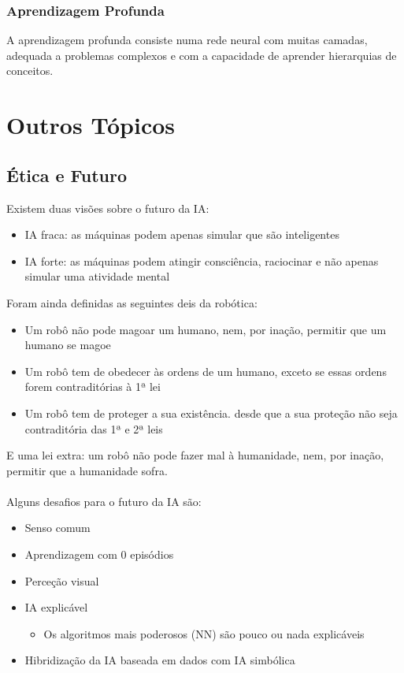 \documentclass[10pt,a4paper]{report}
\begin{document}
\subsection{Aprendizagem Profunda}
A aprendizagem profunda consiste numa rede neural com muitas camadas, adequada a problemas complexos e com a capacidade de aprender hierarquias de conceitos.

\chapter{Outros Tópicos}
\section{Ética e Futuro}
Existem duas visões sobre o futuro da IA:
\begin{itemize}
\item IA fraca: as máquinas podem apenas simular que são inteligentes
\item IA forte: as máquinas podem atingir consciência, raciocinar e não apenas simular uma atividade mental
\end{itemize}
Foram ainda definidas as seguintes deis da robótica:
\begin{itemize}
\item Um robô não pode magoar um humano, nem, por inação, permitir que um humano se magoe
\item Um robô tem de obedecer às ordens de um humano, exceto se essas ordens forem contraditórias à 1ª lei
\item Um robô tem de proteger a sua existência. desde que a sua proteção não seja contraditória das 1ª e 2ª leis
\end{itemize}
E uma lei extra: um robô não pode fazer mal à humanidade, nem, por inação, permitir que a humanidade sofra.\\
\\
Alguns desafios para o futuro da IA são:
\begin{itemize}
\item Senso comum
\item Aprendizagem com 0 episódios
\item Perceção visual
\item IA explicável
\begin{itemize}
\item Os algoritmos mais poderosos (NN) são pouco ou nada explicáveis
\end{itemize}
\item Hibridização da IA baseada em dados com IA simbólica
\end{itemize}
\end{document}
